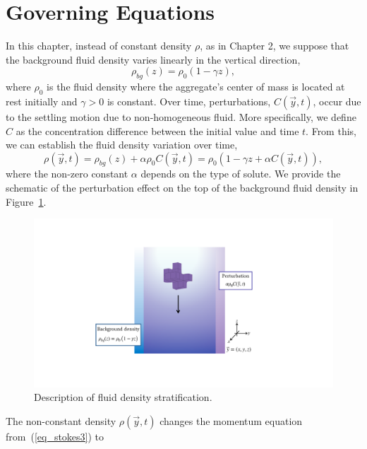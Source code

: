 \section{Governing Equations}
In this chapter, instead of constant density $\rho$, as in Chapter 2, we suppose that the background fluid density varies linearly in the vertical direction,
\begin{equation}
\rho_{bg}(z) =  \rho_0 \left(1 - \gamma z \right),
\label{eq_rho_bg}
\end{equation}
where $\rho_0$ is the fluid density where the aggregate's center of mass is located at rest initially and $\gamma > 0$ is constant.
Over time, perturbations, $C(\vec{y},t)$, occur due to the settling motion due to non-homogeneous fluid. More specifically, we define $C$ as the concentration difference between the initial value and time $t$.
From this, we can establish the fluid density variation over time,
\begin{equation}
	\rho(\vec{y},t ) 
	= \rho_{bg}(z) +  \alpha \rho_0 C(\vec{y},t) 
	 = \rho_0 \left( 1 - \gamma z  + \alpha  C(\vec{y},t) \right),
\label{eq_density}
\end{equation}
where the non-zero constant $\alpha$ depends on the type of solute. We provide the schematic of the perturbation effect on the top of the background fluid density in Figure~\ref{fig_stratification_schematics}.
\begin{figure}[ht]
	\begin{center}
	\includegraphics[scale=0.38]{./figures/fig_stratification_schematics}
	\caption{Description of fluid density stratification.}
	\label{fig_stratification_schematics}
	\end{center}
\end{figure}
The non-constant density $\rho(\vec{y},t)$ changes the momentum equation from~(\ref{eq_stokes3}) to 
